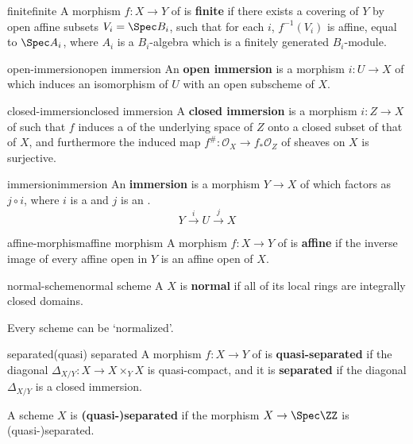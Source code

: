 \begin{topic}{finite}{finite}
    A morphism $f : X \to Y$ of  is \textbf{finite} if there exists a covering of $Y$ by open affine subsets $V_i = \Spec B_i$, such that for each $i$, $f^{-1}(V_i)$ is affine, equal to $\Spec A_i$, where $A_i$ is a $B_i$-algebra which is a finitely generated $B_i$-module.
\end{topic}

\begin{topic}{open-immersion}{open immersion}
    An \textbf{open immersion} is a morphism $i : U \to X$ of  which induces an isomorphism of $U$ with an open subscheme of $X$.
\end{topic}

\begin{topic}{closed-immersion}{closed immersion}
    A \textbf{closed immersion} is a morphism $i : Z \to X$ of  such that $f$ induces a  of the underlying space of $Z$ onto a closed subset of that of $X$, and furthermore the induced map $f^\# : \mathcal{O}_X \to f_*\mathcal{O}_Z$ of sheaves on $X$ is surjective.
\end{topic}

\begin{topic}{immersion}{immersion}
    An \textbf{immersion} is a morphism $Y \to X$ of  which factors as $j \circ i$, where $i$ is a  and $j$ is an .
    \[ Y \xrightarrow{i} U \xrightarrow{j} X \]
\end{topic}

\begin{topic}{affine-morphism}{affine morphism}
    A morphism $f : X \to Y$ of  is \textbf{affine} if the inverse image of every affine open in $Y$ is an affine open of $X$. 
\end{topic}

\begin{topic}{normal-scheme}{normal scheme}
    A  $X$ is \textbf{normal} if all of its local rings are integrally closed domains.
    
    Every scheme can be `normalized'.
\end{topic}

\begin{topic}{separated}{(quasi) separated}
    A morphism $f : X \to Y$ of  is \textbf{quasi-separated} if the diagonal $\Delta_{X/Y} : X \to X \times_Y X$ is quasi-compact, and it is \textbf{separated} if the diagonal $\Delta_{X/Y}$ is a closed immersion.
    
    A scheme $X$ is \textbf{(quasi-)separated} if the morphism $X \to \Spec \ZZ$ is (quasi-)separated.
\end{topic}

